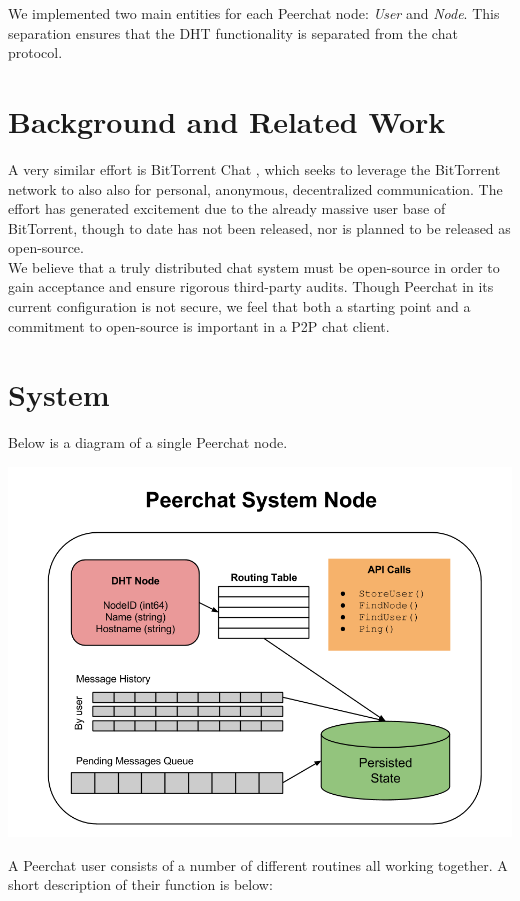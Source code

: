\documentclass{article}
\begin{document}
We implemented two main entities for each Peerchat node: \textit{User} and \textit{Node}. This separation ensures that the DHT functionality is separated from the chat protocol. 

\section{Background and Related Work}

A very similar effort is BitTorrent Chat \cite{Goldoor13}, which seeks to leverage the BitTorrent network to also also for personal, anonymous, decentralized communication. The effort has generated excitement due to the already massive user base of BitTorrent, though to date has not been released, nor is planned to be released as open-source. \\

We believe that a truly distributed chat system must be open-source in order to gain acceptance and ensure rigorous third-party audits. Though Peerchat in its current configuration is not secure, we feel that both a starting point and a commitment to open-source is important in a P2P chat client. 

\section{System}

Below is a diagram of a single Peerchat node. 

\includegraphics[scale=0.5]{peerchat}

A Peerchat user consists of a number of different routines all working together. A short description of their function is below: \\
\end{document}
